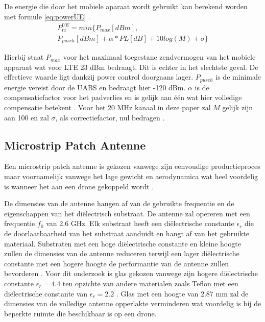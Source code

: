 \documentclass[twocolumn]{phdsymp_dutch}
\begin{document}
De energie die door het mobiele aparaat wordt gebruikt kan berekend worden met formule \ref{eq:powerUE} \cite{J22_plets2015joint}.
\begin{multline} 
P_{tx}^{UE} = min \big\{P_{max} [dBm] , \\
 P_{pusch} [dBm] + \alpha * PL [dB] + 10log(M) + \sigma \big\}
\label{eq:powerUE}
\end{multline}


Hierbij staat $P_{max}$ voor het maximaal toegestane zendvermogen van het mobiele apparaat wat voor LTE 23 dBm bedraagt.
Dit is echter in het slechtste geval. De effectieve waarde ligt dankzij power control doorgaans lager.
$P_{pusch}$ is de minimale energie vereist door de 
\gls{UABS} en bedraagt hier -120 dBm. 
$\alpha$ is de compensatiefactor voor het padverlies en is gelijk aan \'e\'en wat hier volledige compensatie betekent \cite{J32,J33}.
Voor het 20 MHz kanaal in deze paper zal $M$ gelijk zijn aan 100 en
 zal $\sigma$,  als correctiefactor, nul bedragen \cite{J22_plets2015joint,J32}.

\subsection{Microstrip Patch Antenne}
Een microstrip patch antenne is gekozen vanwege zijn eenvoudige productieproces maar voornamelijk vanwege het
 lage gewicht en aerodynamica wat heel voordelig is wanneer het aan een drone gekoppeld wordt \cite{J13_microstripadvantages}.

De dimensies van de antenne hangen af van de gebruikte frequentie en de eigenschappen van het di\"electrisch substraat.
De antenne zal opereren met een frequentie $f_0$ van 2.6 GHz. 
Elk substraat heeft een di\"electrische constante $\epsilon_r$ die de doorlaatbaarheid 
van het substraat aanduidt en hangt af van het gebruikte materiaal.
Substraten met een hoge di\"electrische constante en kleine hoogte zullen de dimensies van de antenne reduceren 
terwijl  een lager di\"electrische constante met een hogere hoogte de performantie van de 
antenne zullen bevorderen \cite{J14_antennadesign,J15_antennadesign}. 
Voor dit onderzoek is glas gekozen vanwege zijn hogere di\"electrische constante
 $\epsilon_r = 4.4$ ten opzichte van andere materialen zoals Teflon met een di\"electrische constante
van $\epsilon_r = 2.2$ \cite{J14_antennadesign}. 
Glas met een hoogte van 2.87 mm 
zal de dimensies van de volledige antenne opperlakte verminderen wat 
voordelig is bij de beperkte ruimte die beschikbaar is op een drone.
\end{document}
